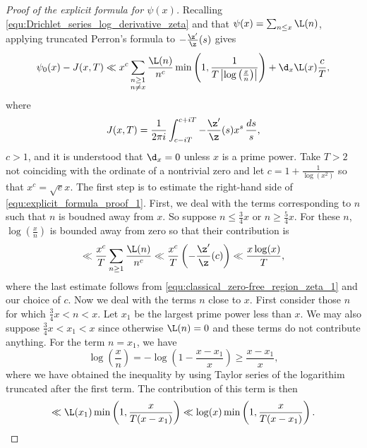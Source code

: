      \begin{proof}[Proof of the explicit formula for $\psi(x)$]
        Recalling \cref{equ:Drichlet_series_log_derivative_zeta} and that $\psi(x) = \sum_{n \le x}\L(n)$, applying truncated Perron's formula to $-\frac{\z'}{\z}(s)$ gives
        \begin{equation}\label{equ:explicit_formula_proof_1}
          \psi_{0}(x)-J(x,T) \ll x^{c}\sum_{\substack{n \ge 1 \\ n \neq x}}\frac{\L(n)}{n^{c}}\min\left(1,\frac{1}{T\left|\log\left(\frac{x}{n}\right)\right|}\right)+\d_{x}\L(x)\frac{c}{T},
        \end{equation}
        where
        \[
          J(x,T) = \frac{1}{2\pi i}\int_{c-iT}^{c+iT}-\frac{\z'}{\z}(s)x^{s}\,\frac{ds}{s},
        \]
        $c > 1$, and it is understood that $\d_{x} = 0$ unless $x$ is a prime power. Take $T > 2$ not coinciding with the ordinate of a nontrivial zero and let $c = 1+\frac{1}{\log(x^{2})}$ so that $x^{c} = \sqrt{e}x$. The first step is to estimate the right-hand side of \cref{equ:explicit_formula_proof_1}. First, we deal with the terms corresponding to $n$ such that $n$ is boudned away from $x$. So suppose $n \le \frac{3}{4}x$ or $n \ge \frac{5}{4}x$. For these $n$, $\log\left(\frac{x}{n}\right)$ is bounded away from zero so that their contribution is
        \begin{equation}\label{equ:explicit_formula_proof_2}
          \ll \frac{x^{c}}{T}\sum_{n \ge 1}\frac{\L(n)}{n^{c}} \ll \frac{x^{c}}{T}\left(-\frac{\z'}{\z}(c)\right) \ll \frac{x\log(x)}{T},
        \end{equation}
        where the last estimate follows from \cref{equ:classical_zero-free_region_zeta_1} and our choice of $c$. Now we deal with the terms $n$ close to $x$. First consider those $n$ for which $\frac{3}{4}x < n < x$. Let $x_{1}$ be the largest prime power less than $x$. We may also suppose $\frac{3}{4}x < x_{1} < x$ since otherwise $\L(n) = 0$ and these terms do not contribute anything. For the term $n = x_{1}$, we have
        \[
          \log\left(\frac{x}{n}\right) = -\log\left(1-\frac{x-x_{1}}{x}\right) \ge \frac{x-x_{1}}{x},
        \]
        where we have obtained the inequality by using Taylor series of the logarithim truncated after the first term. The contribution of this term is then
        \begin{equation}\label{equ:explicit_formula_proof_3}
          \ll \L(x_{1})\min\left(1,\frac{x}{T(x-x_{1})}\right) \ll \log(x)\min\left(1,\frac{x}{T(x-x_{1})}\right).
        \end{equation}

\end{proof}
